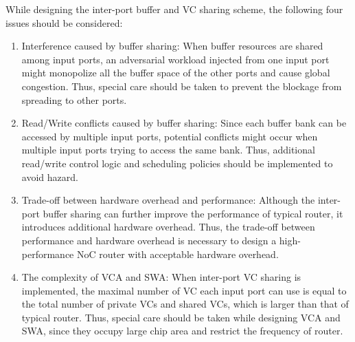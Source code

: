 \documentclass[paper]{ieice}
\begin{document}
While designing the inter-port buffer and VC sharing scheme, the following four issues should be considered:
\begin{enumerate}
\item Interference caused by buffer sharing: When buffer resources are shared among input ports, an adversarial workload injected from one input port might monopolize all the buffer space of the other ports and cause global congestion. Thus, special care should be taken to prevent the blockage from spreading to other ports.
\item Read/Write conflicts caused by buffer sharing: Since each buffer bank can be accessed by multiple input ports, potential conflicts might occur when multiple input ports trying to access the same bank. Thus, additional read/write control logic and scheduling policies should be implemented to avoid hazard.
\item Trade-off between hardware overhead and performance: Although the inter-port buffer sharing can further improve the performance of typical router, it introduces additional hardware overhead. Thus, the trade-off between performance and hardware overhead is necessary to design a high-performance NoC router with acceptable hardware overhead.
\item The complexity of VCA and SWA: When inter-port VC sharing is implemented, the maximal number of VC each input port can use is equal to the total number of private VCs and shared VCs, which is larger than that of typical router. Thus, special care should be taken while designing VCA and SWA, since they occupy large chip area and restrict the frequency of router.
\end{enumerate}
\end{document}
